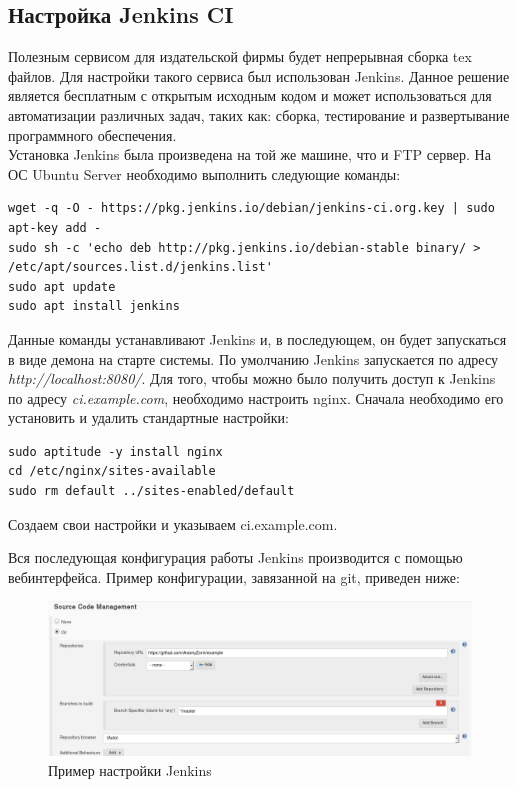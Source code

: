 \subsection{Настройка Jenkins CI}
Полезным сервисом для издательской фирмы будет непрерывная сборка tex файлов. Для настройки такого сервиса был использован Jenkins. Данное решение является бесплатным с открытым исходным кодом и может использоваться для автоматизации различных задач, таких как: сборка, тестирование и развертывание программного обеспечения.
\\Установка Jenkins была произведена на той же машине, что и FTP сервер. На ОС Ubuntu Server необходимо выполнить следующие команды:
\begin{lstlisting}
wget -q -O - https://pkg.jenkins.io/debian/jenkins-ci.org.key | sudo apt-key add -
sudo sh -c 'echo deb http://pkg.jenkins.io/debian-stable binary/ > /etc/apt/sources.list.d/jenkins.list'
sudo apt update
sudo apt install jenkins
\end{lstlisting}
Данные команды устанавливают Jenkins и, в последующем, он будет запускаться в виде демона на старте системы. По умолчанию Jenkins запускается по адресу \textit{http://localhost:8080/}. Для того, чтобы можно было получить доступ к Jenkins по адресу \textit{ci.example.com}, необходимо настроить nginx. Сначала необходимо его установить и удалить стандартные настройки:
\begin{lstlisting}
sudo aptitude -y install nginx
cd /etc/nginx/sites-available
sudo rm default ../sites-enabled/default
\end{lstlisting}

Создаем свои настройки и указываем ci.example.com.


Вся последующая конфигурация работы Jenkins производится с помощью вебинтерфейса. Пример конфигурации, завязанной на git, приведен ниже:
\begin{figure}[H]
	\begin{center}
		\includegraphics[width=0.6\linewidth]{pics/jenkins}
		\caption{Пример настройки Jenkins}
		\label{fig:jenkins}
	\end{center}
\end{figure}


